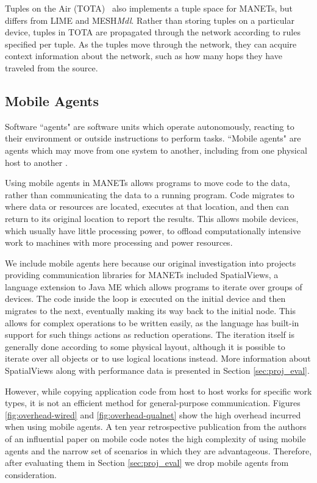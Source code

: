 Tuples on the Air (TOTA)~\cite{tota} also implements a tuple space for MANETs, but differs from LIME and MESH\textit{Mdl}. Rather than storing tuples on a particular device, tuples in TOTA are propagated through the network according to rules specified per tuple. As the tuples move through the network, they can acquire context information about the network, such as how many hops they have traveled from the source.

\subsection{Mobile Agents}

Software ``agents" are software units which operate autonomously, reacting to their environment or outside instructions to perform tasks. ``Mobile agents" are agents which may move from one system to another, including from one physical host to another \cite{mobileagents}.

Using mobile agents in MANETs allows programs to move code to the data, rather than communicating the data to a running program. Code migrates to where data or resources are located, executes at that location, and then can return to its original location to report the results. This allows mobile devices, which usually have little processing power, to offload computationally intensive work to machines with more processing and power resources.

We include mobile agents here because our original investigation into projects providing communication libraries for MANETs included SpatialViews\cite{sv}, a language extension to Java ME which allows programs to iterate over groups of devices. The code inside the loop is executed on the initial device and then migrates to the next, eventually making its way back to the initial node. This allows for complex operations to be written easily, as the language has built-in support for such things actions as reduction operations. The iteration itself is generally done according to some physical layout, although it is possible to iterate over all objects or to use logical locations instead. More information about SpatialViews along with performance data is presented in Section \ref{sec:proj_eval}.

However, while copying application code from host to host works for specific work types, it is not an efficient method for general-purpose communication. Figures \ref{fig:overhead-wired} and \ref{fig:overhead-qualnet} show the high overhead incurred when using mobile agents. A ten year retrospective publication from the authors of an influential paper on mobile code \cite{carzaniga1997designing} notes the high complexity of using mobile agents and the narrow set of scenarios in which they are advantageous\cite{carzaniga2007code}. Therefore, after evaluating them in Section \ref{sec:proj_eval} we drop mobile agents from consideration.